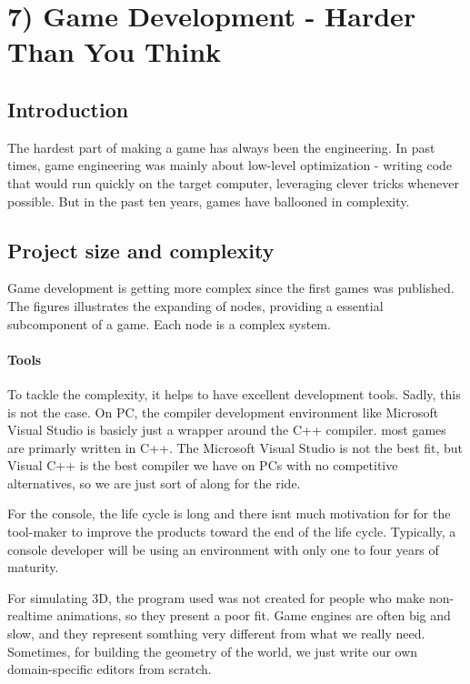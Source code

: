 \chapter*{7) Game Development - Harder Than You Think}
    
  \section*{Introduction}
  The hardest part of making a game has always been the engineering. In past times, game engineering was mainly about low-level optimization - writing code that would run quickly on the target computer, leveraging clever tricks whenever possible. But in the past ten years, games have ballooned in complexity. 

  \section*{Project size and complexity}
  Game development is getting more complex since the first games was published. The figures illustrates the expanding of nodes, providing a essential subcomponent of a game. Each node is a complex system.

    \subsubsection*{Tools}
    To tackle the complexity, it helps to have excellent development tools. Sadly, this is not the case. On PC, the compiler development environment like Microsoft Visual Studio is basicly just a wrapper around the C++ compiler. most games are primarly written in C++. The Microsoft Visual Studio is not the best fit, but Visual C++ is the best compiler we have on PCs with no competitive alternatives, so we are just sort of along for the ride. 

    For the console, the life cycle is long and there isnt much motivation for for the tool-maker to improve the products toward the end of the life cycle. Typically, a console developer will be using an environment with only one to four years of maturity. 

    For simulating 3D, the program used was not created for people who make non-realtime animations, so they present a poor fit. Game engines are often big and slow, and they represent somthing very different from what we really need. 
    Sometimes, for building the geometry of the world, we just write our own domain-specific editors from scratch. 

